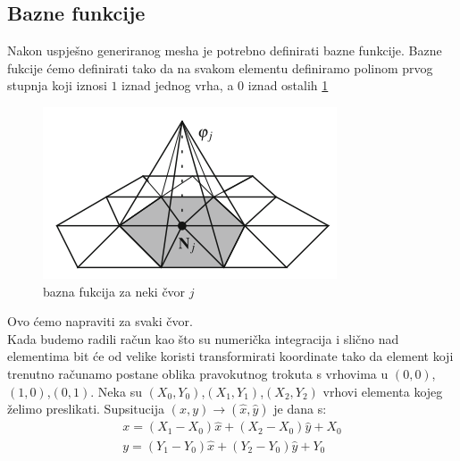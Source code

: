 \documentclass[zavrsnirad]{../fer}
\begin{document}
\subsection{Bazne funkcije}

Nakon uspješno generiranog mesha je potrebno definirati
bazne funkcije. Bazne fukcije ćemo definirati tako da
na svakom elementu definiramo polinom prvog stupnja koji
iznosi $1$ iznad jednog vrha, a $0$ iznad ostalih \ref{baznaFja}
\begin{figure}[htb]
	\centering
	\includegraphics[width=0.5\linewidth]{Figures/baznaFja.png}
	\caption{bazna fukcija za neki čvor $j$}
	\label{baznaFja}
\end{figure}
Ovo ćemo napraviti za svaki čvor. 
\bigskip
\\ 
Kada budemo radili račun kao što su numerička integracija i 
slično nad elementima bit će od velike koristi transformirati
koordinate tako da element koji trenutno računamo postane 
oblika pravokutnog trokuta s vrhovima u $(0,0)$,$(1,0)$,$(0,1)$.
Neka su $(X_0, Y_0)$,$(X_1, Y_1)$,$(X_2, Y_2)$ vrhovi elementa
kojeg želimo preslikati. Supsitucija $(x, y) \rightarrow (\hat x, \hat y)$
je dana s:
\begin{align}
  x = (X_1 - X_0)\hat x + (X_2 - X_0)\hat y + X_0 \\ 
  y = (Y_1 - Y_0)\hat x +(Y_2 - Y_0) \hat y + Y_0
\end{align}
\end{document}
